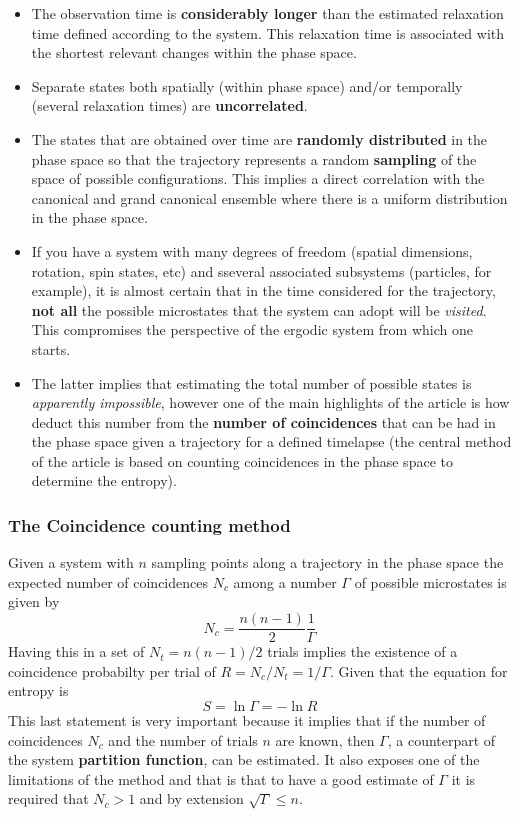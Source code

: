 \documentclass{article}
\begin{document}
\begin{itemize}
    \item The observation time is \textbf{considerably longer} than the estimated relaxation time defined according to the system. This relaxation time is associated with the shortest relevant changes within the phase space.
    
    \item Separate states both spatially (within phase space) and/or temporally (several relaxation times) are \textbf{uncorrelated}.
    
    \item The states that are obtained over time are \textbf{randomly distributed} in the phase space so that the trajectory represents a random \textbf{sampling} of the space of possible configurations. This implies a direct correlation with the canonical and grand canonical ensemble where there is a uniform distribution in the phase space.
    
    \item If you have a system with many degrees of freedom (spatial dimensions, rotation, spin states, etc) and sseveral associated subsystems (particles, for example), it is almost certain that in the time considered for the trajectory, \textbf{not all} the possible microstates that the system can adopt will be \textit{visited}. This compromises the perspective of the ergodic system from which one starts.
    
    \item The latter implies that estimating the total number of possible states is \textit{apparently impossible}, however one of the main highlights of the article is how deduct this number from the \textbf{number of coincidences} that can be had in the phase space given a trajectory for a defined timelapse (the central method of the article is based on counting coincidences in the phase space to determine the entropy).
    
\end{itemize}
\subsubsection{The Coincidence counting method }
Given a system with $n$ sampling points along a trajectory in the phase space the expected number of coincidences $N_c$ among a number $\Gamma$ of possible microstates is given by
\begin{equation}
    N_c = \frac{n(n-1)}{2} \frac{1}{\Gamma}
\end{equation}
Having this in a set of $N_t = n(n-1)/2$ trials implies the existence of a coincidence probabilty per trial of $R = N_c/N_t = 1/\Gamma$. Given that the equation for entropy is
\begin{equation}
    S = \ln{\Gamma} = - \ln{R}
\end{equation}
This last statement is very important because it implies that if the number of coincidences $N_c$ and the number of trials  $n$ are known, then $\Gamma$, a counterpart of the system \textbf{partition function}, can be estimated. It also exposes one of the limitations of the method and that is that to have a good estimate of $\Gamma$ it is required that $N_c > 1$ and by extension $\sqrt{\Gamma} \leq n$.
\end{document}
